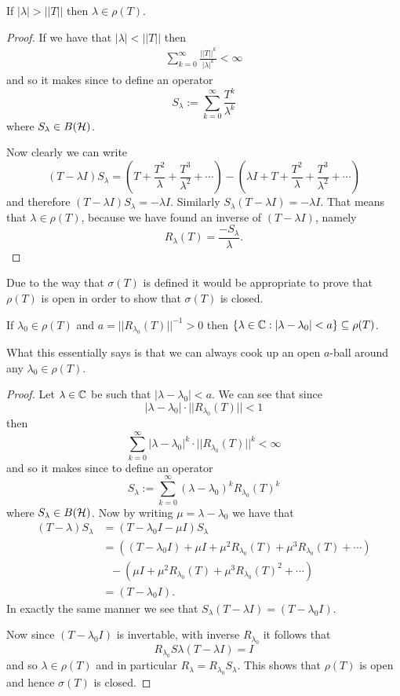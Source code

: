 \documentclass{unswmaths}
\begin{document}
\begin{lemma}
\label{lem:sigma_bdd}
	If $ | \lambda | > ||T|| $ then $ \lambda \in \rho(T) $.
\end{lemma}
\begin{proof}
	If we have that $ | \lambda | < ||T|| $ then 
	\begin{align*}
		\sum_{k=0}^\infty \frac{||T||^k}{|\lambda|^k} < \infty 
	\end{align*}
	and so it makes since to define an operator
	$$
		S_\lambda := \sum_{k=0}^\infty \frac{T^k}{\lambda^k}
	$$
	where  $ S_\lambda \in B(\mathcal{H}) $.
	
	Now clearly we can write
	$$
		(T-\lambda I) S_\lambda = (T + \frac{T^2}{\lambda} + \frac{T^3}{\lambda^2} + \cdots ) - (\lambda I + T + \frac{T^2}{\lambda} + \frac{T^3}{\lambda^2} + \cdots )
	$$
	and therefore $ (T-\lambda I) S_\lambda = - \lambda I $.
	Similarly $ S_\lambda (T-\lambda I) = - \lambda I $.
	That means that $ \lambda \in \rho(T) $, because we have found an inverse of $ (T-\lambda I ) $, namely
	$$ R_\lambda(T) = \frac{-S_\lambda}{\lambda}. $$
\end{proof}

Due to the way that $ \sigma(T) $ is defined it would be appropriate to prove that $ \rho(T) $ is open
in order to show that $ \sigma(T) $ is closed.
\begin{lemma}
\label{lem:sigma_closed}
	If $ \lambda_0 \in \rho(T) $ and $ a = ||R_{\lambda_0}(T)||^{-1} > 0 $ then 
	$ \{ \lambda \in \mathbb{C} : | \lambda - \lambda_0 | < a \} \subseteq \rho(T) $. 
\end{lemma}
What this essentially says is that we can always cook up an open $a$-ball around any $ \lambda_0 \in \rho(T) $.
\begin{proof}
	Let $ \lambda \in \mathbb{C} $ be such that $ |\lambda - \lambda_0 | < a $.
	We can see that since $$ |\lambda - \lambda_0| \cdot || R_{\lambda_0} (T) || < 1 $$ then 
	$$
		\sum_{k=0}^\infty |\lambda - \lambda_0|^k\cdot || R_{\lambda_0}(T) ||^k < \infty
	$$
	and so it makes since to define an operator
	$$
		S_\lambda := \sum_{k=0}^\infty (\lambda -\lambda_0)^k R_{\lambda_0}(T)^{k}
	$$
	where $ S_\lambda \in B(\mathcal{H}) $.
	Now by writing $ \mu = \lambda - \lambda_0 $ we have that
	\begin{align*}
		(T - \lambda)S_\lambda &= (T - \lambda_0 I - \mu I)S_\lambda \\
			&= \left( (T- \lambda_0 I) + \mu I + \mu^2 R_{\lambda_0}(T) + \mu^3R_{\lambda_0}(T) + \cdots \right) \\
			& \ \ \ - \left( \mu I + \mu^2 R_{\lambda_0}(T) + \mu^3 R_{\lambda_0}(T)^2 + \cdots  \right) \\
			&= (T - \lambda_0 I ).
	\end{align*}
	In exactly the same manner we see that $ S_\lambda(T-\lambda I) = (T - \lambda_0 I)$.
	
	Now since $ (T-\lambda_0 I ) $ is invertable, with inverse $ R_{\lambda_0} $ it follows that 
	$$
		R_{\lambda_0}S\lambda (T -\lambda I ) = I
	$$
	and so $ \lambda \in \rho(T) $ and in particular $ R_{\lambda} = R_{\lambda_0}S_{\lambda} $.
	This shows that $ \rho(T) $ is open and hence $ \sigma(T) $ is closed.
\end{proof}
\end{document}

